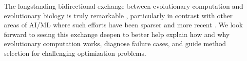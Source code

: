 The longstanding bidirectional exchange between evolutionary computation and evolutionary biology is truly remarkable \citep{pennock2007models,goodman2020evolution}, particularly in contrast with other areas of AI/ML where such efforts have been sparser and more recent \citep{marblestone2016toward,richards2019deep}.
We look forward to seeing this exchange deepen to better help explain how and why evolutionary computation works, diagnose failure cases, and guide method selection for challenging optimization problems.

